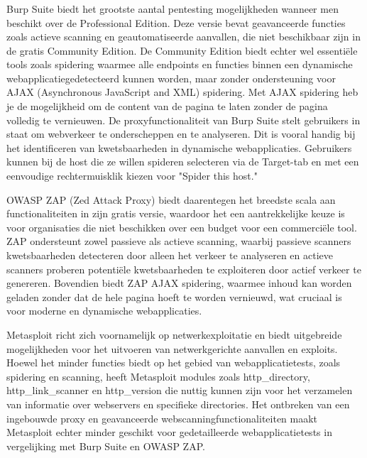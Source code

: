 \subsubsection{}
Burp Suite biedt het grootste aantal pentesting mogelijkheden wanneer men beschikt over de Professional Edition. Deze 
versie bevat geavanceerde functies zoals actieve scanning en geautomatiseerde aanvallen, die niet beschikbaar zijn in de 
gratis Community Edition. De Community Edition biedt echter wel essentiële tools zoals spidering waarmee alle endpoints 
en functies binnen een dynamische webapplicatiegedetecteerd kunnen worden, maar zonder ondersteuning 
voor AJAX (Asynchronous JavaScript and XML) spidering. Met AJAX spidering heb je de mogelijkheid om de content van de pagina 
te laten zonder de pagina volledig te vernieuwen. De proxyfunctionaliteit van Burp Suite stelt gebruikers in staat om webverkeer te onderscheppen en te 
analyseren. Dit is vooral handig bij het identificeren van kwetsbaarheden in dynamische webapplicaties. Gebruikers kunnen bij de 
host die ze willen spideren selecteren via de Target-tab en met een eenvoudige rechtermuisklik kiezen voor "Spider this host."

OWASP ZAP (Zed Attack Proxy) biedt daarentegen het breedste scala aan functionaliteiten in zijn gratis versie, waardoor het 
een aantrekkelijke keuze is voor organisaties die niet beschikken over een budget voor een commerciële tool. ZAP ondersteunt zowel 
passieve als actieve scanning, waarbij passieve scanners kwetsbaarheden detecteren door alleen het verkeer te analyseren en 
actieve scanners proberen potentiële kwetsbaarheden te exploiteren door actief verkeer te genereren. Bovendien biedt ZAP AJAX 
spidering, waarmee inhoud kan worden geladen zonder dat de hele pagina hoeft te worden vernieuwd, wat cruciaal is voor 
moderne en dynamische webapplicaties.

Metasploit richt zich voornamelijk op netwerkexploitatie en biedt uitgebreide mogelijkheden voor het uitvoeren van netwerkgerichte 
aanvallen en exploits. Hoewel het minder functies biedt op het gebied van webapplicatietests, zoals spidering en scanning, 
heeft Metasploit modules zoals http\_directory, http\_link\_scanner en http\_version die nuttig kunnen zijn voor het verzamelen 
van informatie over webservers en specifieke directories. Het ontbreken van een ingebouwde proxy en geavanceerde 
webscanningfunctionaliteiten maakt Metasploit echter minder geschikt voor gedetailleerde webapplicatietests in vergelijking 
met Burp Suite en OWASP ZAP.

